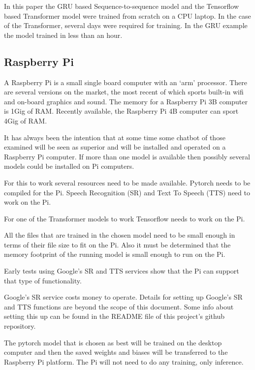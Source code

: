 In this paper the GRU based Sequence-to-sequence model and the Tensorflow based Transformer model were trained from scratch on a CPU laptop. In the case of the Transformer, several days were required for training. In the GRU example the model trained in less than an hour.

\subsection{Raspberry Pi}

A Raspberry Pi is a small single board computer with an `arm' processor. There are several versions on the market, the most recent of which sports built-in wifi and on-board graphics and sound. The memory for a Raspberry Pi 3B computer is 1Gig of RAM. Recently available, the Raspberry Pi 4B computer can sport 4Gig of RAM.

It has always been the intention that at some time some chatbot of those examined will be seen as superior and will be installed and operated on a Raspberry Pi computer. If more than one model is available then possibly several models could be installed on Pi computers.

For this to work several resources need to be made available. Pytorch needs to be compiled for the Pi. Speech Recognition (\ac{SR}) and Text To Speech (TTS) need to work on the Pi.

For one of the Transformer models to work Tensorflow needs to work on the Pi.

All the files that are trained in the chosen model need to be small enough in terms of their file size to fit on the Pi. Also it must be determined that the memory footprint of the running model is small enough to run on the Pi.


Early tests using Google\textquoteright s SR and TTS services show that the Pi can support that type of functionality. 

Google's SR service costs money to operate. Details for setting up Google's SR and TTS functions are beyond the scope of this document. Some info about setting this up can be
found in the README file of this project\textquoteright s github repository.

The pytorch model that is chosen as best will be trained on the desktop computer and then the saved weights and biases will be transferred to the Raspberry Pi platform. The Pi will not need to do any training, only inference. 

